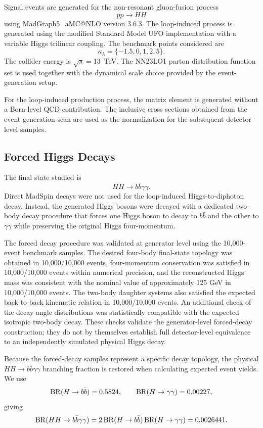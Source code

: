 \documentclass[11pt,a4paper]{article}
\begin{document}
Signal events are generated for the non-resonant gluon-fusion process
\[
pp\to HH
\]
using MadGraph5\_aMC@NLO version 3.6.3. The loop-induced process is generated using the modified Standard Model UFO implementation with a variable Higgs trilinear coupling. The benchmark points considered are
\[
\kappa_\lambda=\{-1.5,0,1,2,5\}.
\]
The collider energy is $\sqrt{s}=13$~TeV. The NN23LO1 parton distribution function set is used together with the dynamical scale choice provided by the event-generation setup.

For the loop-induced production process, the matrix element is generated without a Born-level QCD contribution. The inclusive cross sections obtained from the event-generation scan are used as the normalization for the subsequent detector-level samples.

\subsection{Forced Higgs Decays}

The final state studied is
\[
HH\to b\bar b\gamma\gamma.
\]
Direct MadSpin decays were not used for the loop-induced Higgs-to-diphoton decay. Instead, the generated Higgs bosons were decayed with a dedicated two-body decay procedure that forces one Higgs boson to decay to $b\bar b$ and the other to $\gamma\gamma$ while preserving the original Higgs four-momentum.

The forced decay procedure was validated at generator level using the 10,000-event benchmark samples. The desired four-body final-state topology was obtained in 10,000/10,000 events, four-momentum conservation was satisfied in 10,000/10,000 events within numerical precision, and the reconstructed Higgs mass was consistent with the nominal value of approximately 125 GeV in 10,000/10,000 events. The two-body daughter systems also satisfied the expected back-to-back kinematic relation in 10,000/10,000 events. An additional check of the decay-angle distributions was statistically compatible with the expected isotropic two-body decay. These checks validate the generator-level forced-decay construction; they do not by themselves establish full detector-level equivalence to an independently simulated physical Higgs decay.

Because the forced-decay samples represent a specific decay topology, the physical $HH\to b\bar b\gamma\gamma$ branching fraction is restored when calculating expected event yields. We use
\[
{\rm BR}(H\to b\bar b)=0.5824,
\qquad
{\rm BR}(H\to\gamma\gamma)=0.00227,
\]
giving
\[
{\rm BR}(HH\to b\bar b\gamma\gamma)
=
2\,{\rm BR}(H\to b\bar b)\,
{\rm BR}(H\to\gamma\gamma)
=
0.0026441.
\]
\end{document}
